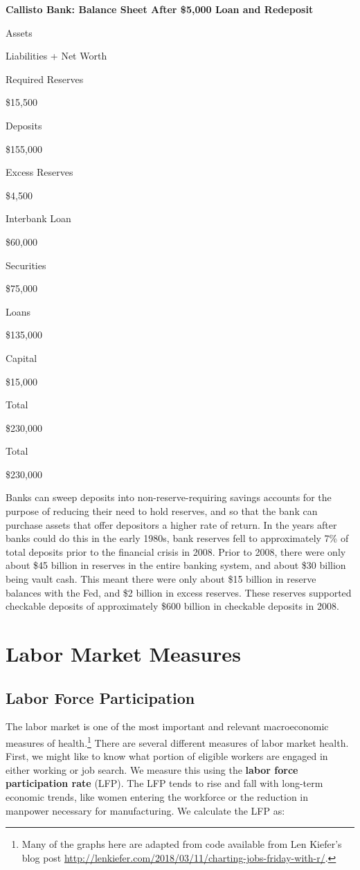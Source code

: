 \documentclass[
]{book}
\begin{document}
\label{tab:t35}\textbf{Callisto Bank: Balance Sheet After \$5,000 Loan and Redeposit}

Assets

Liabilities + Net Worth

Required Reserves

\$15,500

Deposits

\$155,000

Excess Reserves

\$4,500

Interbank Loan

\$60,000

Securities

\$75,000

Loans

\$135,000

Capital

\$15,000

Total

\$230,000

Total

\$230,000

Banks can sweep deposits into non-reserve-requiring savings accounts for the purpose of reducing their need to hold reserves, and so that the bank can purchase assets that offer depositors a higher rate of return. In the years after banks could do this in the early 1980s, bank reserves fell to approximately 7\% of total deposits prior to the financial crisis in 2008. Prior to 2008, there were only about \$45 billion in reserves in the entire banking system, and about \$30 billion being vault cash. This meant there were only about \$15 billion in reserve balances with the Fed, and \$2 billion in excess reserves. These reserves supported checkable deposits of approximately \$600 billion in checkable deposits in 2008.

\hypertarget{labor}{%
\chapter{Labor Market Measures}\label{labor}}

\hypertarget{labor-force-participation}{%
\section{Labor Force Participation}\label{labor-force-participation}}

The labor market is one of the most important and relevant macroeconomic measures of health.\footnote{Many of the graphs here are adapted from code available from Len Kiefer's blog post \url{http://lenkiefer.com/2018/03/11/charting-jobs-friday-with-r/}.} There are several different measures of labor market health. First, we might like to know what portion of eligible workers are engaged in either working or job search. We measure this using the \textbf{labor force participation rate} (LFP). The LFP tends to rise and fall with long-term economic trends, like women entering the workforce or the reduction in manpower necessary for manufacturing. We calculate the LFP as:
\end{document}
